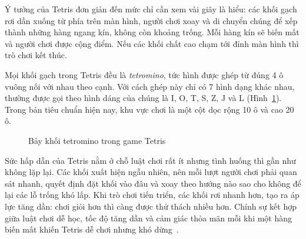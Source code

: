 \documentclass[12pt,a4paper,oneside]{report}
\begin{document}
Ý tưởng của Tetris đơn giản đến mức chỉ cần xem vài giây là hiểu: các khối gạch rơi dần xuống từ phía trên màn hình, người chơi xoay và di chuyển chúng để xếp thành những hàng ngang kín, không còn khoảng trống. Mỗi hàng kín sẽ biến mất và người chơi được cộng điểm. Nếu các khối chất cao chạm tới đỉnh màn hình thì trò chơi kết thúc.

Mọi khối gạch trong Tetris đều là \textit{tetromino}, tức hình được ghép từ đúng 4 ô vuông nối với nhau theo cạnh. Với cách ghép này chỉ có 7 hình dạng khác nhau, thường được gọi theo hình dáng của chúng là I, O, T, S, Z, J và L (Hình~\ref{fig:bay_tetromino}). Trong bản tiêu chuẩn hiện nay, khu vực chơi là một cột dọc rộng 10 ô và cao 20 ô.

\begin{figure}[H]
\centering
{}
\caption{Bảy khối tetromino trong game Tetris}\label{fig:bay_tetromino}
\end{figure}

Sức hấp dẫn của Tetris nằm ở chỗ luật chơi rất ít nhưng tình huống thì gần như không lặp lại. Các khối xuất hiện ngẫu nhiên, nên mỗi lượt người chơi phải quan sát nhanh, quyết định đặt khối vào đâu và xoay theo hướng nào sao cho không để lại các lỗ trống khó lấp. Khi trò chơi tiến triển, các khối rơi nhanh hơn, tạo ra áp lực tăng dần: chơi giỏi hơn thì càng được thử thách nhiều hơn. Chính sự kết hợp giữa luật chơi dễ học, tốc độ tăng dần và cảm giác thỏa mãn mỗi khi một hàng biến mất khiến Tetris dễ chơi nhưng khó dừng~\cite{filfre_tetris}.
\end{document}
